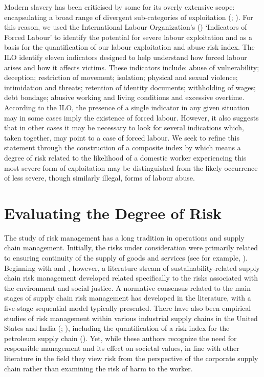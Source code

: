 \documentclass[
  12pt,
  letterpaper,
  DIV=11,
  numbers=noendperiod]{scrartcl}
\theoremstyle{plain}
\theoremstyle{definition}
\begin{document}
Modern slavery has been criticised by some for its overly extensive
scope: encapsulating a broad range of divergent sub-categories of
exploitation (\textcite{oconnell_davidson_margins_2015};
\textcite{gutierrez-huerter_o_change_2023}). For this reason, we used
the International Labour Organization's (\textcite{ILO11-indicators})
`Indicators of Forced Labour' to identify the potential for severe
labour exploitation and as a basis for the quantification of our labour
exploitation and abuse risk index. The ILO identify eleven indicators
designed to help understand how forced labour arises and how it affects
victims. These indicators include: abuse of vulnerability; deception;
restriction of movement; isolation; physical and sexual violence;
intimidation and threats; retention of identity documents; withholding
of wages; debt bondage; abusive working and living conditions and
excessive overtime. According to the ILO, the presence of a single
indicator in any given situation may in some cases imply the existence
of forced labour. However, it also suggests that in other cases it may
be necessary to look for several indications which, taken together, may
point to a case of forced labour. We seek to refine this statement
through the construction of a composite index by which means a degree of
risk related to the likelihood of a domestic worker experiencing this
most severe form of exploitation may be distinguished from the likely
occurrence of less severe, though similarly illegal, forms of labour
abuse.

\section{Evaluating the Degree of
Risk}\label{evaluating-the-degree-of-risk}

The study of risk management has a long tradition in operations and
supply chain management. Initially, the risks under consideration were
primarily related to ensuring continuity of the supply of goods and
services (see for example, \textcite{juttner_supply_2003}). Beginning
with \textcite{anderson_critical_2006} and
\textcite{anderson_sustainability_2009}, however, a literature stream of
sustainability-related supply chain risk management developed related
specifically to the risks associated with the environment and social
justice. A normative consensus related to the main stages of supply
chain risk management has developed in the literature, with a five-stage
sequential model typically presented. There have also been empirical
studies of risk management within various industrial supply chains in
the United States and India (\textcite{tarei_hybrid_2018};
\textcite{dellana_scale_2021}), including the quantification of a risk
index for the petroleum supply chain (\textcite{tarei_hybrid_2018}).
Yet, while these authors recognize the need for responsible management
and its effect on societal values, in line with other literature in the
field they view risk from the perspective of the corporate supply chain
rather than examining the risk of harm to the worker.
\end{document}

